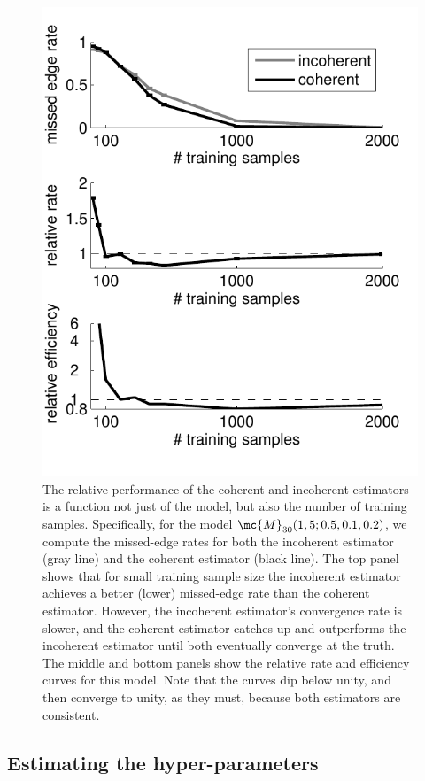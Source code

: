 \documentclass[10pt,journal,cspaper,compsoc]{IEEEtran}
\begin{document}
\begin{figure}[htbp]
	\centering
		\includegraphics[width=0.8\linewidth]{../figs/RE_V30_s5_p10_q20.pdf}
	\caption{The relative performance of the coherent and incoherent estimators is a function not just of the model, but also the number of training samples.  Specifically, for the model $\mc{M}_{30}(1,5;0.5,0.1,0.2)$, we compute the missed-edge rates for both the incoherent estimator (gray line) and the coherent estimator (black line).  The top panel shows that for small training sample size the incoherent estimator achieves a better (lower) missed-edge rate than the coherent estimator. However, the incoherent estimator's convergence rate is slower, and the coherent estimator catches up and outperforms the incoherent estimator until both eventually converge at the truth.  The middle and bottom panels show the relative rate and efficiency curves for this model. Note that the curves dip below unity, and then converge to unity, as they must, because both estimators are consistent. }
	\label{fig:RE}
\end{figure}


\subsection{Estimating the hyper-parameters} %
\label{sub:estimating_the_hyper_parameters}
\end{document}
